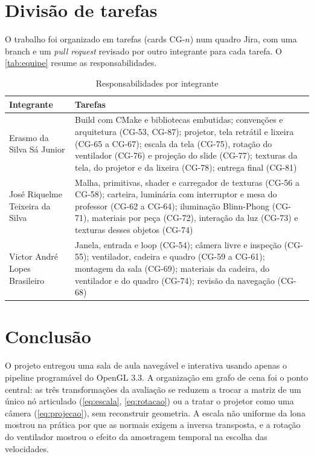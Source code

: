 \documentclass[
  12pt,          %
  oneside,       %
  a4paper,       %
  chapter=TITLE, %
  english,
  brazil,        %
]{abntex2}
\newcommand{\fonteautores}{\fonte{Elaborado pelos autores (2026).}}
\begin{document}
\chapter{Divisão de tarefas}
\label{cap:equipe}

O trabalho foi organizado em tarefas (cards CG-$n$) num quadro Jira, com uma branch e um \emph{pull request}
revisado por outro integrante para cada tarefa. O \autoref{tab:equipe} resume as responsabilidades.

\begin{table}[htb]
  \centering
  \caption{Responsabilidades por integrante}
  \label{tab:equipe}
  \footnotesize
  \begin{tabularx}{\textwidth}{|l|X|}
    \hline
    \textbf{Integrante} & \textbf{Tarefas} \\
    \hline
    Erasmo da Silva Sá Junior & Build com CMake e bibliotecas embutidas; convenções e arquitetura (CG-53,
      CG-87); projetor, tela retrátil e lixeira (CG-65 a CG-67); escala da tela (CG-75), rotação do
      ventilador (CG-76) e projeção do slide (CG-77); texturas da tela, do projetor e da lixeira (CG-78);
      entrega final (CG-81) \\
    José Riquelme Teixeira da Silva & Malha, primitivas, shader e carregador de texturas (CG-56 a CG-58);
      carteira, luminária com interruptor e mesa do professor (CG-62 a CG-64); iluminação Blinn-Phong
      (CG-71), materiais por peça (CG-72), interação da luz (CG-73) e texturas desses objetos (CG-74) \\
    Victor André Lopes Brasileiro & Janela, entrada e loop (CG-54); câmera livre e inspeção (CG-55);
      ventilador, cadeira e quadro (CG-59 a CG-61); montagem da sala (CG-69); materiais da cadeira, do
      ventilador e do quadro (CG-74); revisão da navegação (CG-68) \\
    \hline
  \end{tabularx}
  \fonteautores
\end{table}

\chapter{Conclusão}
\label{cap:conclusao}

O projeto entregou uma sala de aula navegável e interativa usando apenas o pipeline programável do OpenGL 3.3.
A organização em grafo de cena foi o ponto central: as três transformações da avaliação se reduzem a trocar a
matriz de um único nó articulado (\autoref{eq:escala}, \autoref{eq:rotacao}) ou a tratar o projetor como uma
câmera (\autoref{eq:projecao}), sem reconstruir geometria. A escala não uniforme da lona mostrou na prática por
que as normais exigem a inversa transposta, e a rotação do ventilador mostrou o efeito da amostragem temporal na
escolha das velocidades.
\end{document}
